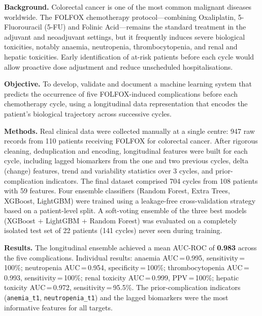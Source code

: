 \documentclass[12pt,a4paper]{report}
\begin{document}
\noindent\textbf{Background.}
Colorectal cancer is one of the most common malignant diseases worldwide. The FOLFOX chemotherapy protocol---combining Oxaliplatin, 5-Fluorouracil (5-FU) and Folinic Acid---remains the standard treatment in the adjuvant and neoadjuvant settings, but it frequently induces severe biological toxicities, notably anaemia, neutropenia, thrombocytopenia, and renal and hepatic toxicities. Early identification of at-risk patients before each cycle would allow proactive dose adjustment and reduce unscheduled hospitalisations.

\vspace{0.5em}
\noindent\textbf{Objective.}
To develop, validate and document a machine learning system that predicts the occurrence of five FOLFOX-induced complications before each chemotherapy cycle, using a longitudinal data representation that encodes the patient's biological trajectory across successive cycles.

\vspace{0.5em}
\noindent\textbf{Methods.}
Real clinical data were collected manually at a single centre: 947 raw records from 110 patients receiving FOLFOX for colorectal cancer. After rigorous cleaning, deduplication and encoding, longitudinal features were built for each cycle, including lagged biomarkers from the one and two previous cycles, delta (change) features, trend and variability statistics over 3 cycles, and prior-complication indicators. The final dataset comprised 704 cycles from 108 patients with 59 features. Four ensemble classifiers (Random Forest, Extra Trees, XGBoost, LightGBM) were trained using a leakage-free cross-validation strategy based on a patient-level split. A soft-voting ensemble of the three best models (XGBoost + LightGBM + Random Forest) was evaluated on a completely isolated test set of 22 patients (141 cycles) never seen during training.

\vspace{0.5em}
\noindent\textbf{Results.}
The longitudinal ensemble achieved a mean AUC-ROC of \textbf{0.983} across the five complications. Individual results: anaemia AUC\,=\,0.995, sensitivity\,=\,100\%; neutropenia AUC\,=\,0.954, specificity\,=\,100\%; thrombocytopenia AUC\,=\,0.993, sensitivity\,=\,100\%; renal toxicity AUC\,=\,0.999, PPV\,=\,100\%; hepatic toxicity AUC\,=\,0.972, sensitivity\,=\,95.5\%. The prior-complication indicators ({\tt anemia\_t1}, {\tt neutropenia\_t1}) and the lagged biomarkers were the most informative features for all targets.
\end{document}
